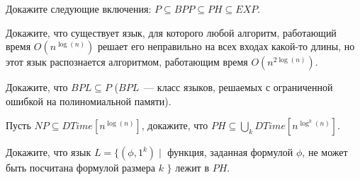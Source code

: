 \begin{task}
    Докажите следующие включения: $P \subseteq BPP \subseteq PH \subseteq EXP$.
\end{task}

\begin{task}
    Докажите, что существует язык, для которого любой алгоритм, работающий время
    $O(n^{\log(n)})$ решает его неправильно на всех входах какой-то длины, но
    этот язык распознается алгоритмом, работающим время $O(n^{2 \log(n)})$.
\end{task}

\begin{task}
    Докажите, что $BPL \subseteq P$ ($BPL$~--- класс языков, решаемых с ограниченной
    ошибкой на полиномиальной памяти).
\end{task}

\begin{task}
    Пусть $NP \subseteq DTime[n^{\log(n)}]$, докажите, что $PH \subseteq \bigcup\limits_{k}DTime[n^{\log^k(n)}]$.
\end{task}

\begin{task}
    Докажите, что язык $L = \{(\phi, 1^k) \mid$ функция, заданная формулой $\phi$, не может быть посчитана формулой размера $k$
    $\}$ лежит в $PH$.
\end{task}